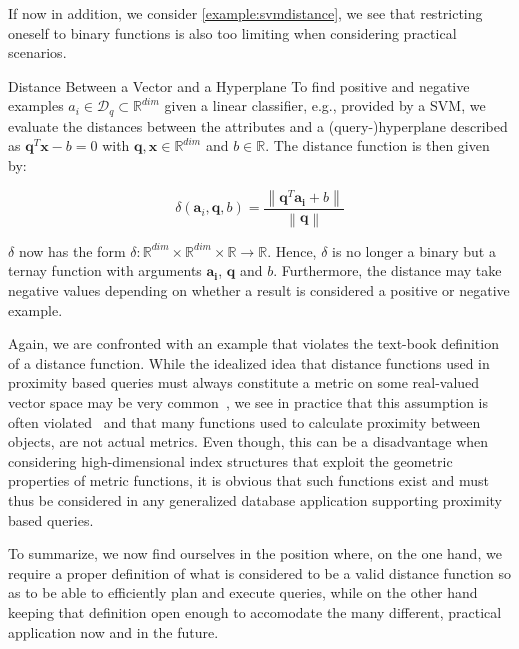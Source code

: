 If now in addition, we consider \cref{example:svmdistance}, we see that restricting oneself to binary functions is also too limiting when considering practical scenarios.

\begin{example}[label=example:svmdistance]{Distance Between a Vector and a Hyperplane}{}
    To find positive and negative examples $a_{i} \in \mathcal{D}_q \subset \mathbb{R}^{dim}$ given a linear classifier, e.g., provided by a SVM, we evaluate the distances between the attributes and a (query-)hyperplane described as $\mathbf{q}^T\mathbf{x} - b = 0$ with $\mathbf{q},\mathbf{x} \in \mathbb{R}^{dim}$ and $b \in \mathbb{R}$. The distance function is then given by:

    \begin{equation}
        \delta (\mathbf{a}_i, \mathbf{q}, b) = \frac{\left\|\mathbf{q}^T \mathbf{a_i} + b \right\|}{\left\|\mathbf{q}\right\|}
    \end{equation}
    
    $\delta$ now has the form $\delta \colon \mathbb{R}^{dim} \times \mathbb{R}^{dim} \times \mathbb{R} \to \mathbb{R}$. Hence, $\delta$ is no longer a binary but a ternay function with arguments $\mathbf{a_{i}}$, $\mathbf{q}$ and $b$. Furthermore, the distance may take negative values depending on whether a result is considered a positive or negative example.
\end{example}


Again, we are confronted with an example that violates the text-book definition of a distance function. While the idealized idea that distance functions used in proximity based queries must always constitute a metric on some real-valued vector space may be very common~\cite{Zezula:2006similarity}, we see in practice that this assumption is often violated~\cite{Bernhauer:2019Nonmetric}  and that many functions used to calculate proximity between objects, are not actual metrics. Even though, this can be a disadvantage when considering high-dimensional index structures that exploit the geometric properties of metric functions, it is obvious that such functions exist and must thus be considered in any generalized database application supporting proximity based queries. 

To summarize, we now find ourselves in the position where, on the one hand, we require a proper definition of what is considered to be a valid distance function so as to be able to efficiently plan and execute queries, while on the other hand keeping that definition open enough to accomodate the many different, practical application now and in the future.

